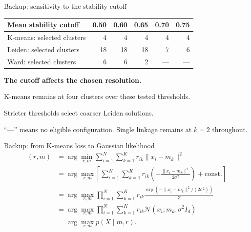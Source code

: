 \begin{frame}{Backup: sensitivity to the stability cutoff}
  \small\renewcommand{\arraystretch}{1.45}
  \begin{tabular}{@{}lrrrrr@{}}
    \toprule
    Mean stability cutoff & 0.50 & 0.60 & 0.65 & 0.70 & 0.75\\
    \midrule
    K-means: selected clusters & 4 & 4 & 4 & 4 & 4\\
    Leiden: selected clusters & 18 & 18 & 18 & 7 & 6\\
    Ward: selected clusters & 6 & 6 & 2 & --- & ---\\
    \bottomrule
  \end{tabular}
  \vspace{2mm}\par
  \textbf{The cutoff affects the chosen resolution.}\par
  K-means remains at four clusters over these tested thresholds.\par
  Stricter thresholds select coarser Leiden solutions.
  \vspace{3mm}\par
  ``---'' means no eligible configuration. Single linkage remains at $k=2$ throughout.
  \source{}
\end{frame}


\begin{frame}{Backup: from K-means loss to Gaussian likelihood}
  \small\setlength{\abovedisplayskip}{2pt}\setlength{\belowdisplayskip}{2pt}\setlength{\jot}{1pt}
  \begin{align*}
    (r,m)
    &=\arg\min_{r,m}\sum_{i=1}^{N}\sum_{k=1}^{K}r_{ik}\lVert x_i-m_k\rVert^2\\[1mm]
    &=\arg\max_{r,m}\left[\sum_{i=1}^{N}\sum_{k=1}^{K}r_{ik}
       \left(-\frac{\lVert x_i-m_k\rVert^2}{2\sigma^2}\right)+\mathrm{const.}\right]\\[1mm]
    &=\arg\max_{r,m}\prod_{i=1}^{N}\sum_{k=1}^{K}r_{ik}
       \frac{\exp\!\left(-\lVert x_i-m_k\rVert^2/(2\sigma^2)\right)}{Z}\\[1mm]
    &=\arg\max_{r,m}\prod_{i=1}^{N}\sum_{k=1}^{K}r_{ik}\mathcal{N}(x_i;m_k,\sigma^2 I_d)\\[1mm]
    &=\arg\max_{r,m}p(X\mid m,r).
  \end{align*}
\end{frame}

